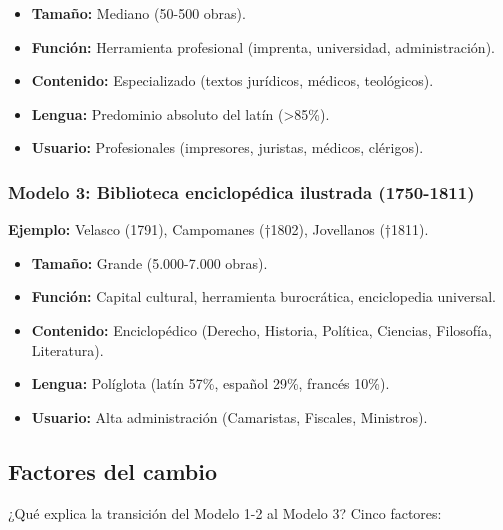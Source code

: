\documentclass[12pt,a4paper]{article}
\begin{document}
\begin{itemize}
\item \textbf{Tamaño:} Mediano (50-500 obras).
\item \textbf{Función:} Herramienta profesional (imprenta, universidad, administración).
\item \textbf{Contenido:} Especializado (textos jurídicos, médicos, teológicos).
\item \textbf{Lengua:} Predominio absoluto del latín (>85\%).
\item \textbf{Usuario:} Profesionales (impresores, juristas, médicos, clérigos).
\end{itemize}

\subsubsection{Modelo 3: Biblioteca enciclopédica ilustrada (1750-1811)}

\textbf{Ejemplo:} Velasco (1791), Campomanes (†1802), Jovellanos (†1811).

\begin{itemize}
\item \textbf{Tamaño:} Grande (5.000-7.000 obras).
\item \textbf{Función:} Capital cultural, herramienta burocrática, enciclopedia universal.
\item \textbf{Contenido:} Enciclopédico (Derecho, Historia, Política, Ciencias, Filosofía, Literatura).
\item \textbf{Lengua:} Políglota (latín 57\%, español 29\%, francés 10\%).
\item \textbf{Usuario:} Alta administración (Camaristas, Fiscales, Ministros).
\end{itemize}

\subsection{Factores del cambio}

¿Qué explica la transición del Modelo 1-2 al Modelo 3? Cinco factores:
\end{document}

